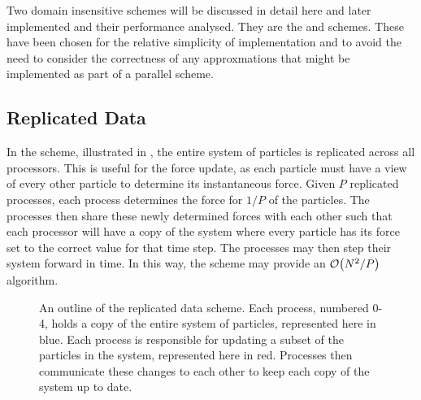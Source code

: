 %
Two domain insensitive schemes will be discussed in detail here and
later implemented and their performance analysed.
%
They are the \replicateddata{} and \systolicloop{} schemes.
%
These have been chosen for the relative simplicity of implementation
and to avoid the need to consider the correctness of any
approxmations that might be implemented as part of a parallel scheme.



\subsection{Replicated Data}
\label{sec:background:subsec:replicated_data}

%
In the \replicateddata{} scheme, illustrated in
,
the entire system of particles is replicated across all processors.
%
This is useful for the force update, as each particle must have a view of
every other particle to determine its instantaneous force.
%
Given $P$ replicated processes,
each process determines the force for $1/P$ of the particles.
%
The processes then share these newly determined forces with each other
such that each processor will have a copy of the system where every
particle has its force set to the correct value for that time step.
%
The processes may then step their system forward in time.
%
In this way, the \replicateddata{} scheme may provide
an $\mathcal{O}{\left({ N^2/P }\right)}$ algorithm.


\begin{figure}[!ht]
    \begin{center}
    \end{center}
    \caption{
        An outline of the replicated data scheme.
        Each process, numbered 0-4,
        holds a copy of the entire system of particles,
        represented here in blue.
        Each process is responsible for updating a subset of the
        particles in the system, represented here in red.
        Processes then communicate these changes to each other
        to keep each copy of the system up to date.
    }
    \label{fig:replicated_data_illustration}
\end{figure}


